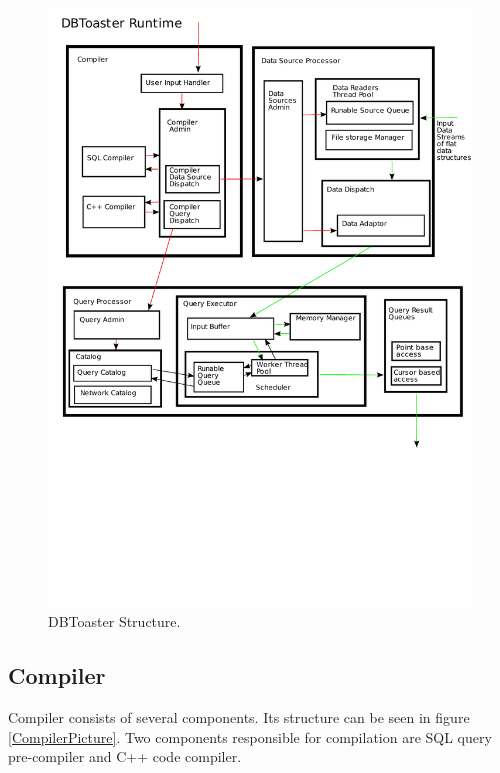 \documentclass[14pt]{article}
\begin{document}

\begin{figure}
  \includegraphics[width=4.50in]{../figures/DBToasterRuntime.pdf}
  \caption{DBToaster Structure.}
  \label{DBToasterPic}
\end{figure}



\subsection{Compiler}

Compiler consists of several components. Its structure can be seen in figure \ref{CompilerPicture}. Two components responsible for compilation are SQL query pre-compiler and C++ code compiler. 
\end{document}
